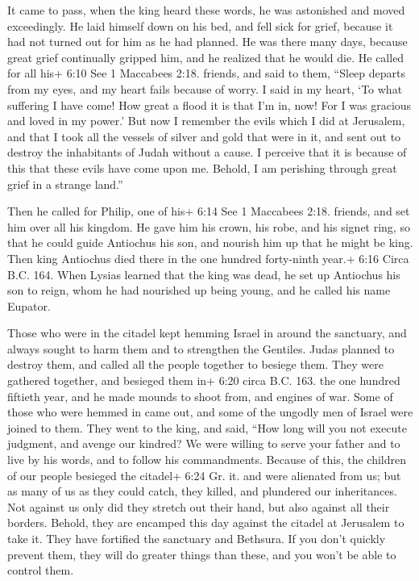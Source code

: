  It came to pass, when the king heard these words, he was
astonished and moved exceedingly. He laid himself down on his bed, and
fell sick for grief, because it had not turned out for him as he had
planned.  He was there many days, because great grief
continually gripped him, and he realized that he would die.
 He called for all his+ 6:10 See 1 Maccabees 2:18. friends,
and said to them, ``Sleep departs from my eyes, and my heart fails
because of worry.  I said in my heart, `To what suffering I
have come! How great a flood it is that I'm in, now! For I was gracious
and loved in my power.'  But now I remember the evils which
I did at Jerusalem, and that I took all the vessels of silver and gold
that were in it, and sent out to destroy the inhabitants of Judah
without a cause.  I perceive that it is because of this
that these evils have come upon me. Behold, I am perishing through great
grief in a strange land.''

 Then he called for Philip, one of his+ 6:14 See 1
Maccabees 2:18. friends, and set him over all his kingdom. 
He gave him his crown, his robe, and his signet ring, so that he could
guide Antiochus his son, and nourish him up that he might be king.
 Then king Antiochus died there in the one hundred
forty-ninth year.+ 6:16 Circa B.C. 164.  When Lysias
learned that the king was dead, he set up Antiochus his son to reign,
whom he had nourished up being young, and he called his name Eupator.

 Those who were in the citadel kept hemming Israel in
around the sanctuary, and always sought to harm them and to strengthen
the Gentiles.  Judas planned to destroy them, and called
all the people together to besiege them.  They were
gathered together, and besieged them in+ 6:20 circa B.C. 163. the one
hundred fiftieth year, and he made mounds to shoot from, and engines of
war.  Some of those who were hemmed in came out, and some
of the ungodly men of Israel were joined to them.  They
went to the king, and said, ``How long will you not execute judgment,
and avenge our kindred?  We were willing to serve your
father and to live by his words, and to follow his commandments.
 Because of this, the children of our people besieged the
citadel+ 6:24 Gr. it. and were alienated from us; but as many of us as
they could catch, they killed, and plundered our inheritances.
 Not against us only did they stretch out their hand, but
also against all their borders.  Behold, they are encamped
this day against the citadel at Jerusalem to take it. They have
fortified the sanctuary and Bethsura.  If you don't quickly
prevent them, they will do greater things than these, and you won't be
able to control them.

